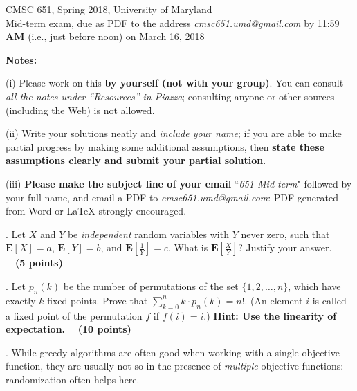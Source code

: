\documentclass{article}[11pt]
\begin{document}
\newcommand{\E}{\textbf{E}}
\newcommand{\var}{\textbf{var}}

\begin{center}
CMSC 651, Spring 2018, University of Maryland \\
Mid-term exam, due as PDF to the address \emph{cmsc651.umd@gmail.com} by 11:59 \textbf{AM} (i.e., just before noon) on March 16, 2018
\end{center}

\medskip \noindent
\textbf{Notes:} 

\medskip \noindent
(i) Please work on this \textbf{by yourself (not with your group)}. You can consult \emph{all the notes under ``Resources'' in Piazza}; consulting anyone or other sources (including the Web) is not allowed. 

\medskip \noindent
(ii) Write your solutions neatly and \emph{include your name}; if you are able to make partial progress by making some
additional assumptions, then \textbf{state these assumptions clearly and submit
your partial solution}. 

\medskip \noindent
(iii) \textbf{Please make the subject line of your email} ``\textit{651 Mid-term}" followed by
your full name, and email a PDF to \emph{cmsc651.umd@gmail.com}: PDF generated from Word or LaTeX strongly encouraged. 

 \medskip \medskip {}. Let $X$ and $Y$ be \emph{independent} random variables with $Y$ never zero, such that
$\E[X] = a$, $\E[Y] = b$, and $\E\left[\frac{1}{Y}\right] = c$. What is $\E\left[\frac{X}{Y}\right]$? Justify your answer. ~~\textbf{(5 points)} 

\medskip \medskip {}. 
Let $p_n(k)$ be the number of permutations of the
set $\{1, 2, \ldots, n\}$, which have exactly $k$ fixed points. Prove that
$\sum_{k=0}^n k \cdot p_n(k) = n!$. (An element $i$ is called a fixed point of the permutation $f$ if $f(i) = i$.) \textbf{Hint: Use the linearity of expectation.} ~~\textbf{(10 points)} 

\medskip \medskip {}. 
While greedy algorithms are often good when working with a single objective function, they are usually not so in the presence of \emph{multiple} objective functions: randomization often helps here. 
\end{document}
